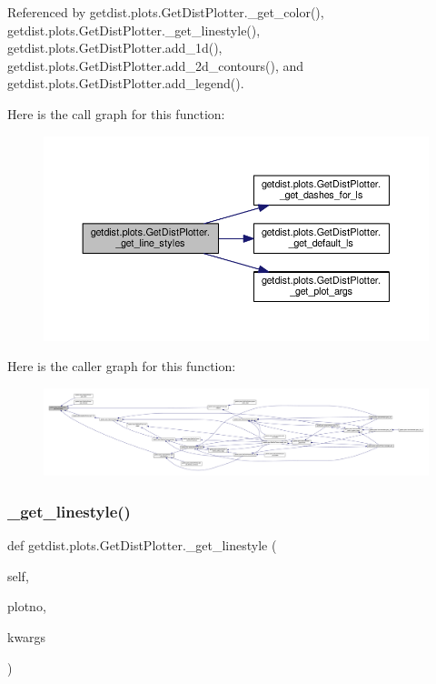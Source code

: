 Referenced by getdist.\+plots.\+Get\+Dist\+Plotter.\+\_\+get\+\_\+color(), getdist.\+plots.\+Get\+Dist\+Plotter.\+\_\+get\+\_\+linestyle(), getdist.\+plots.\+Get\+Dist\+Plotter.\+add\+\_\+1d(), getdist.\+plots.\+Get\+Dist\+Plotter.\+add\+\_\+2d\+\_\+contours(), and getdist.\+plots.\+Get\+Dist\+Plotter.\+add\+\_\+legend().

Here is the call graph for this function\+:
\nopagebreak
\begin{figure}[H]
\begin{center}
\leavevmode
\includegraphics[width=350pt]{classgetdist_1_1plots_1_1GetDistPlotter_a919928e323c1253b5e2687ad41b331df_cgraph}
\end{center}
\end{figure}
Here is the caller graph for this function\+:
\nopagebreak
\begin{figure}[H]
\begin{center}
\leavevmode
\includegraphics[width=350pt]{classgetdist_1_1plots_1_1GetDistPlotter_a919928e323c1253b5e2687ad41b331df_icgraph}
\end{center}
\end{figure}
\mbox{\label{classgetdist_1_1plots_1_1GetDistPlotter_ac59e8aaef9e884dfd9fe405a57673dbe}} 
\subsubsection{\texorpdfstring{\+\_\+get\+\_\+linestyle()}{\_get\_linestyle()}}
{\footnotesize\ttfamily def getdist.\+plots.\+Get\+Dist\+Plotter.\+\_\+get\+\_\+linestyle (\begin{DoxyParamCaption}\item[{}]{self,  }\item[{}]{plotno,  }\item[{}]{kwargs }\end{DoxyParamCaption})\hspace{0.3cm}{\ttfamily [private]}}

